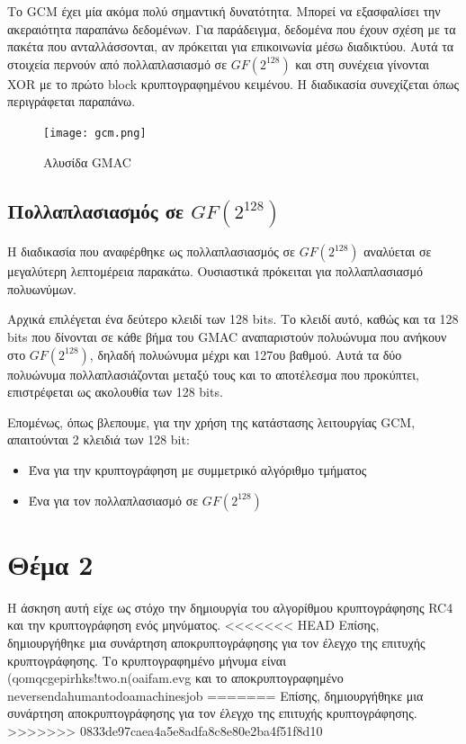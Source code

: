 \documentclass[a4paper, 11pt]{article}
\newcommand{\lt}{\latintext}
\begin{document}
\begin{itemize}
	Το {\lt GCM} έχει μία ακόμα πολύ σημαντική δυνατότητα. Μπορεί να εξασφαλίσει την ακεραιότητα παραπάνω δεδομένων. Για παράδειγμα, δεδομένα που έχουν σχέση με τα πακέτα που ανταλλάσσονται, αν πρόκειται για επικοινωνία μέσω διαδικτύου. Αυτά τα στοιχεία περνούν από πολλαπλασιασμό σε $GF(2^{128})$ και στη συνέχεια γίνονται {\lt XOR} με το πρώτο {\lt block} κρυπτογραφημένου κειμένου. Η διαδικασία συνεχίζεται όπως περιγράφεται παραπάνω.
	\begin{figure}[!ht]
	\centering
	\texttt{[image: gcm.png]}
	\caption{Αλυσίδα {\lt GMAC}}
	\end{figure}

	\subsection*{Πολλαπλασιασμός σε $GF(2^{128})$}
	Η διαδικασία που αναφέρθηκε ως πολλαπλασιασμός σε $GF(2^{128})$ αναλύεται σε μεγαλύτερη λεπτομέρεια παρακάτω. Ουσιαστικά πρόκειται για πολλαπλασιασμό πολυωνύμων.

	Αρχικά επιλέγεται ένα δεύτερο κλειδί των 128 {\lt bits}. Το κλειδί αυτό, καθώς και τα 128 {\lt bits} που δίνονται σε κάθε βήμα του {\lt GMAC} αναπαριστούν πολυώνυμα που ανήκουν στο $GF(2^{128})$, δηλαδή πολυώνυμα μέχρι και 127ου βαθμού. Αυτά τα δύο πολυώνυμα πολλαπλασιάζονται μεταξύ τους και το αποτέλεσμα που προκύπτει, επιστρέφεται ως ακολουθία των 128 {\lt bits}.

	Επομένως, όπως βλεπουμε, για την χρήση της κατάστασης λειτουργίας {\lt GCM}, απαιτούνται 2 κλειδιά των 128 {\lt bit}:
	\begin{itemize}
		\item Ένα για την κρυπτογράφηση με συμμετρικό αλγόριθμο τμήματος
		\item Ένα για τον πολλαπλασιασμό σε $GF(2^{128})$
	\end{itemize}

\end{itemize}

\newpage


\section*{Θέμα 2}

Η άσκηση αυτή είχε ως στόχο την δημιουργία του αλγορίθμου κρυπτογράφησης {\lt RC4} και την κρυπτογράφηση ενός μηνύματος.
<<<<<<< HEAD
Επίσης, δημιουργήθηκε μια συνάρτηση αποκρυπτογράφησης για τον έλεγχο της επιτυχής κρυπτογράφησης. Το κρυπτογραφημένο μήνυμα είναι
{\lt(qomqcgepirhks!two.n(oaifam.evg} και το αποκρυπτογραφημένο {\lt neversendahumantodoamachinesjob}
=======
Επίσης, δημιουργήθηκε μια συνάρτηση αποκρυπτογράφησης για τον έλεγχο της επιτυχής κρυπτογράφησης.
>>>>>>> 0833de97caea4a5e8adfa8c8e80e2ba4f51f8d10
\end{document}

